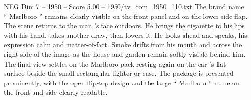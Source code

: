 \begin{textsample}{NEG Dim 7 – 1950 – Score 5.00 – 1950/tv\_com\_1950\_110.txt}
The brand name “ Marlboro ” remains clearly visible on the front panel and on the lower side flap.
The scene returns to the man ’s face outdoors.
He brings the cigarette to his lips with his hand, takes another draw, then lowers it.
He looks ahead and speaks, his expression calm and matter-of-fact.
Smoke drifts from his mouth and across the right side of the image as the house and garden remain softly visible behind him.
The final view settles on the Marlboro pack resting again on the car ’s flat surface beside the small rectangular lighter or case.
The package is presented prominently, with the open flip-top design and the large “ Marlboro ” name on the front and side clearly readable.

\end{textsample}
